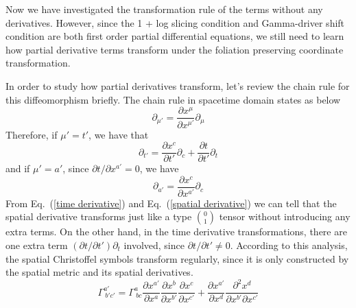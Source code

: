 \documentclass[letterpaper,nofootinbib,prd,amsmath,onecolumn]{revtex4-1}
\begin{document}
Now we have investigated the transformation rule of the terms without any derivatives. However, since the 1 + log slicing condition and Gamma-driver shift condition are both first order partial differential equations, we still need to learn how partial derivative terms transform under the foliation preserving coordinate transformation. 

In order to study how partial derivatives transform, let's review the chain rule for this diffeomorphism briefly. The chain rule in spacetime domain states as below
\begin{equation*}
\partial_{\mu'} = \frac{\partial x^{\mu}}{\partial x^{\mu'}}\partial_{\mu}
\end{equation*}
Therefore, if $\mu' = t'$, we have that
\begin{equation}\label{time derivative}
\partial_{t'} = \frac{\partial x^{c}}{\partial t'}\partial_{c} + \frac{\partial t}{\partial t'}\partial_{t}
\end{equation}
and if $\mu' = a'$, since $\partial t/\partial x^{a'} = 0$, we have
\begin{equation}\label{spatial derivative}
\partial_{a'} = \frac{\partial x^{c}}{\partial x^{a'}}\partial_{c}
\end{equation}
From Eq.~(\ref{time derivative}) and Eq.~(\ref{spatial derivative}) we can tell that the spatial derivative transforms just like a type $0 \choose 1$ tensor without introducing any extra terms. On the other hand, in the time derivative transformations, there are one extra term $\left(\partial t/\partial t'\right)\partial_{t}$ involved, since $\partial t/\partial t' \ne 0$. According to this analysis, the spatial Christoffel symbols transform regularly, since it is only constructed by the spatial metric and its spatial derivatives. 
\begin{equation}
\Gamma^{a'}_{~b'c'} = \Gamma^{a}_{~bc}\frac{\partial x^{a'}}{\partial x^{a}}\frac{\partial x^{b}}{\partial x^{b'}}\frac{\partial x^{c}}{\partial x^{c'}} + \frac{\partial x^{a'}}{\partial x^{d}}\frac{\partial^{2} x^{d}}{\partial x^{b'}\partial x^{c'}}
\end{equation}
\end{document}
